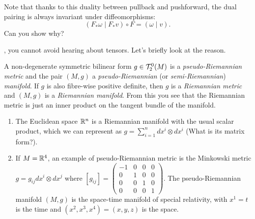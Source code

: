 Note that thanks to this duality between pullback and pushforward, the dual pairing is always invariant under diffeomorphisms:
\begin{equation}\label{eq:pairdualitypull}
	(F_* \omega \mid F_* v)\circ F = (\omega \mid v).
\end{equation}
Can you show why?

, you cannot avoid hearing about tensors.
Let's briefly look at the reason.

\begin{definition}
	A non-degenerate symmetric bilinear form $g\in \mathcal{T}_2^0(M)$ is a \emph{pseudo-Riemannian metric} and the pair $(M,g)$ a \emph{pseudo-Riemannian} (or \emph{semi-Riemannian}) \emph{manifold}.
	If $g$ is also fibre-wise positive definite, then $g$ is a \emph{Riemannian metric} and $(M,g)$ is a \emph{Riemannian manifold}.
	From this you see that the Riemannian metric is just an inner product on the tangent bundle of the manifold.
\end{definition}

\begin{example}
	\begin{enumerate}
		\item The Euclidean space $\mathbb{R}^n$ is a Riemannian manifold with the usual scalar product, which we can represent as $g = \sum_{i=1}^n dx^i\otimes dx^i$ (What is its matrix form?).
		\item If $M=\mathbb{R}^4$, an example of pseudo-Riemannian metric is the Minkowski metric $g = g_{ij} dx^i\otimes dx^j$ where $[g_{ij}] = {\left(\begin{smallmatrix} -1 & 0 & 0 & 0\\ 0 & 1 & 0 & 0 \\ 0 & 0 & 1 & 0 \\ 0 & 0 & 0 & 1 \end{smallmatrix}\right)}$. The pseudo-Riemannian manifold $(M, g)$ is the space-time manifold of special relativity, with $x^1 = t$ is the time and $(x^2, x^3, x^4) = (x,y,z)$ is the space.
	\end{enumerate}
\end{example}

